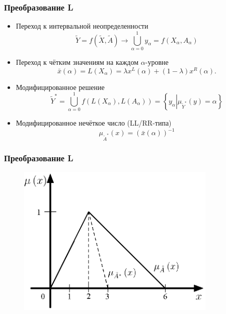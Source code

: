 \documentclass[12pt]{beamer}
\begin{document}
\begin{frame}
  \frametitle{Преобразование L}
  \begin{itemize}
    \item Переход к интервальной неопределенности
      \begin{equation}
        \label{eq:task-transform}
      	\tilde{Y} = f\left( \tilde X, \tilde A \right)\to \bigcup\limits_{\alpha =0}^{1}{y_\alpha}=f\left( X_\alpha, A_\alpha \right)
      \end{equation}
    \item Переход к чётким значениям на каждом $\alpha$-уровне 
      \begin{equation}
        \label{eq:L-transform-base}
        \bar{x}\left( \alpha  \right)=L\left( X_\alpha \right)=\lambda x^L \left( \alpha  \right)+\left( 1-\lambda  \right) x^R \left( \alpha  \right).
      \end{equation}
    \item Модифицированное решение
      \begin{equation}
        \tilde Y^{*}= \bigcup\limits_{\alpha =0}^{1} f\left(L\left( X_\alpha \right), L\left( A_\alpha \right) \right)=\left\{ y_\alpha \left| \mu_{\tilde Y^*}(y)=\alpha \right. \right\}
      \end{equation}
    \item Модифицированное нечёткое число (LL/RR-типа)
      \begin{equation}
        \label{eq:modified-number}
        \mu_{\tilde A^{*}}\left( x \right)={\left( \bar{x}\left( \alpha  \right) \right)}^{-1}
      \end{equation}
  \end{itemize}
\end{frame}

\begin{frame}
  \frametitle{Преобразование L}
  \begin{figure}
    \center
    \includegraphics[width=0.85\textwidth]{sample-224}
  \end{figure}
\end{frame}
\end{document}
